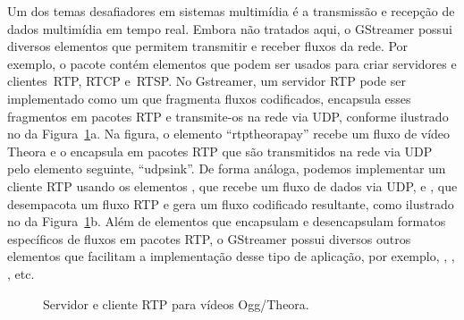 \documentclass{SBCbookchapter}
\begin{document}
Um dos temas desafiadores em sistemas multimídia é a transmissão e recepção
de dados multimídia em tempo real.  Embora não tratados aqui, o GStreamer
possui diversos elementos que permitem transmitir e receber fluxos da rede.
Por exemplo, o pacote  contém elementos que podem ser
usados para criar servidores e clientes~RTP, RTCP e~RTSP\null.  No
Gstreamer, um servidor RTP pode ser implementado como um  que
fragmenta fluxos codificados, encapsula esses fragmentos em pacotes RTP e
transmite-os na rede via UDP, conforme ilustrado no  da
Figura~\ref{fig:pipe-rtp}a.  Na figura, o elemento ``rtptheorapay'' recebe
um fluxo de vídeo Theora e o encapsula em pacotes RTP que são transmitidos
na rede via UDP pelo elemento seguinte, ``udpsink''.  De forma análoga,
podemos implementar um cliente RTP usando os elementos , que
recebe um fluxo de dados via UDP, e , que desempacota um
fluxo RTP e gera um fluxo codificado resultante, como ilustrado no
 da Figura~\ref{fig:pipe-rtp}b.  Além de elementos que
encapsulam e desencapsulam formatos específicos de fluxos em pacotes RTP, o
GStreamer possui diversos outros elementos que facilitam a implementação
desse tipo de aplicação, por exemplo, , ,
, etc.

\begin{figure}[H]
  \centering
  \caption{Servidor e cliente RTP para vídeos Ogg/Theora.}
  \label{fig:pipe-rtp}
\end{figure}
\end{document}

